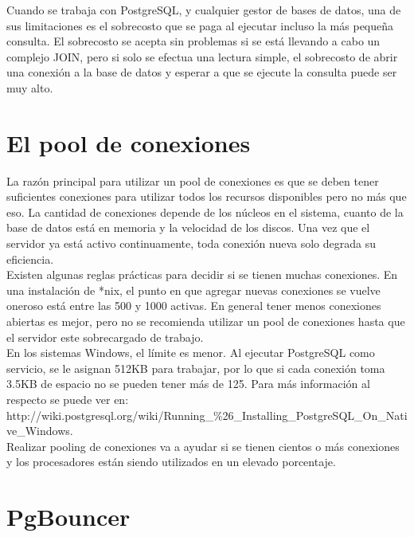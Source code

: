 

Cuando se trabaja con PostgreSQL, y cualquier gestor de bases de datos, una de sus limitaciones es el sobrecosto que se paga al ejecutar incluso la más pequeña consulta. El sobrecosto se acepta sin problemas si se está llevando a cabo un complejo JOIN, pero si solo se efectua una lectura simple, el sobrecosto de abrir una conexión a la base de datos y esperar a que se ejecute la consulta puede ser muy alto.\\

\section{El pool de conexiones}

La razón principal para utilizar un pool de conexiones es que se deben tener suficientes conexiones para utilizar todos los recursos disponibles pero no más que eso. La cantidad de conexiones depende de los núcleos en el sistema, cuanto de la base de datos está en memoria y la velocidad de los discos. Una vez que el servidor ya está activo continuamente, toda conexión nueva solo degrada su eficiencia.\\

Existen algunas reglas prácticas para decidir si se tienen muchas conexiones. En una instalación de *nix, el punto en que agregar nuevas conexiones se vuelve oneroso está entre las 500 y 1000 activas. En general tener menos conexiones abiertas es mejor, pero no se recomienda utilizar un pool de conexiones hasta que el servidor este sobrecargado de trabajo. \cite{GregorySmith2010}\\

En los sistemas Windows, el límite es menor. Al ejecutar PostgreSQL como servicio, se le asignan 512KB para trabajar, por lo que si cada conexión toma 3.5KB de espacio no se pueden tener más de 125. Para más información al respecto se puede ver en:\\

http://wiki.postgresql.org/wiki/Running\_\%26\_Installing\_PostgreSQL\_On\_Native\_Windows.\\

Realizar pooling de conexiones va a ayudar si se tienen cientos o más conexiones y los procesadores están siendo utilizados en un elevado porcentaje.

\section{PgBouncer}

